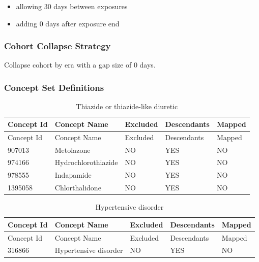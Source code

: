\documentclass[10.5pt]{book}
\providecommand{\tightlist}{%
  \setlength{\itemsep}{0pt}\setlength{\parskip}{0pt}}
\theoremstyle{definition}
\theoremstyle{definition}
\theoremstyle{definition}
\theoremstyle{remark}
\begin{document}
\begin{itemize}
\tightlist
\item
  allowing 30 days between exposures
\item
  adding 0 days after exposure end
\end{itemize}

\subsubsection*{Cohort Collapse
Strategy}\label{cohort-collapse-strategy-4}

Collapse cohort by era with a gap size of 0 days.

\subsubsection*{Concept Set
Definitions}\label{concept-set-definitions-4}

\begin{longtable}[]{@{}lllll@{}}
\caption{\label{tab:thiazidesMono} Thiazide or thiazide-like
diuretic}\tabularnewline
\toprule
Concept Id & Concept Name & Excluded & Descendants &
Mapped\tabularnewline
\midrule
\endfirsthead
\toprule
Concept Id & Concept Name & Excluded & Descendants &
Mapped\tabularnewline
\midrule
\endhead
907013 & Metolazone & NO & YES & NO\tabularnewline
974166 & Hydrochlorothiazide & NO & YES & NO\tabularnewline
978555 & Indapamide & NO & YES & NO\tabularnewline
1395058 & Chlorthalidone & NO & YES & NO\tabularnewline
\bottomrule
\end{longtable}

\begin{longtable}[]{@{}lllll@{}}
\caption{\label{tab:hypertensionThzMono} Hypertensive
disorder}\tabularnewline
\toprule
Concept Id & Concept Name & Excluded & Descendants &
Mapped\tabularnewline
\midrule
\endfirsthead
\toprule
Concept Id & Concept Name & Excluded & Descendants &
Mapped\tabularnewline
\midrule
\endhead
316866 & Hypertensive disorder & NO & YES & NO\tabularnewline
\bottomrule
\end{longtable}
\end{document}
